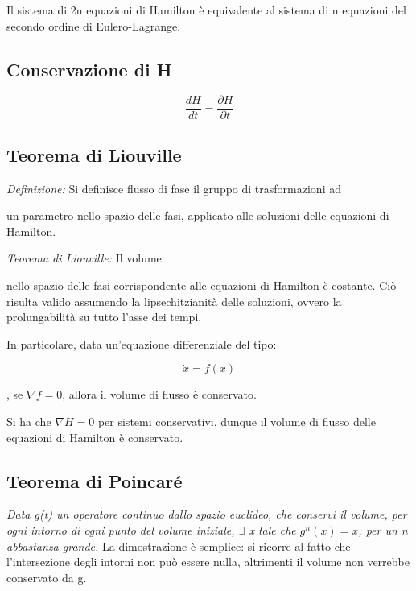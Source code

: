 \documentclass{article}
\begin{document}
            Il sistema di 2n equazioni di Hamilton è equivalente al sistema di n equazioni del secondo ordine di Eulero-Lagrange.

            \subsection{Conservazione di H}

            \begin{equation}
                \frac{d H}{dt}= \frac{\partial H}{\partial t}
            \end{equation}


            \subsection{Teorema di Liouville}
            \textit{Definizione:} Si definisce flusso di fase il gruppo di trasformazioni ad

            un parametro nello spazio delle fasi, applicato alle soluzioni delle equazioni di Hamilton.

            \textit{Teorema di Liouville:} Il volume

            nello spazio delle fasi corrispondente alle equazioni di
            Hamilton è costante.
            Ciò risulta valido assumendo la lipsechitzianità delle soluzioni, ovvero la prolungabilità su tutto l'asse dei tempi.

            In particolare, data un'equazione differenziale del tipo:

            \begin{equation}
                \dot x= f(x)
            \end{equation}

            , se $\nabla f=0$, allora il volume di flusso è conservato.

            Si ha che $\nabla H=0$ per sistemi conservativi, dunque il volume di flusso delle equazioni di Hamilton è conservato.


            \subsection{Teorema di Poincaré}

            \textit{Data g(t) un operatore continuo dallo spazio euclideo, che conservi il volume, per ogni intorno di ogni punto del volume iniziale, $\exists$ x tale che $g^n(x)=x$, per un n abbastanza grande.}
            La dimostrazione è semplice: si ricorre al fatto che l'intersezione degli intorni non può essere nulla, altrimenti il volume non verrebbe conservato da g.
\end{document}
